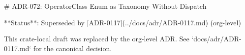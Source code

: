 # ADR-072: OperatorClass Enum as Taxonomy Without Dispatch

**Status**: Superseded by [ADR-0117](../docs/adr/ADR-0117.md) (org-level)

This crate-local draft was replaced by the org-level ADR. See `docs/adr/ADR-0117.md` for the canonical decision.
